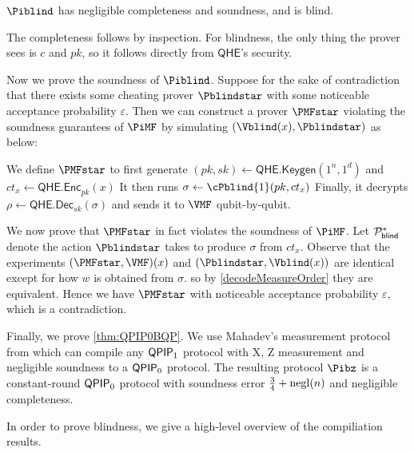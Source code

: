 \begin{thm}
	\label{thm:BlindBQP}
	$\Piblind$ has negligible completeness and soundness, and is blind.
\end{thm}
\begin{prf}
	The completeness follows by inspection.
	For blindness, the only thing the prover sees is $c$ and $pk$, so it follows directly from $\mathsf{QHE}$'s security.
	
	Now we prove the soundness of $\Piblind$.
	Suppose for the sake of contradiction that there exists some cheating prover $\Pblindstar$ with some noticeable acceptance probability $\varepsilon$.
	Then we can construct a prover $\PMFstar$ violating the soundness guarantees of $\PiMF$ by simulating $(\Vblind(x), \Pblindstar)$ as below:

	We define $\PMFstar$ to first generate
	$(pk, sk)\leftarrow\mathsf{QHE.Keygen}(1^n, 1^d)$
	and
	$ct_x\leftarrow\mathsf{QHE.Enc}_{pk}(x)$
	It then runs $\sigma\leftarrow\cPblind{1}(pk, ct_x)$
	Finally, it decrypts
	$\rho\leftarrow\mathsf{QHE.Dec}_{sk}(\sigma)$
	and sends it to $\VMF$ qubit-by-qubit.

	We now prove that $\PMFstar$ in fact violates the soundness of $\PiMF$.
	Let $\mathcal{P}_{\mathsf{blind}}^*$ denote the action $\Pblindstar$ takes to produce $\sigma$ from $ct_x$.
	Observe that the experiments $(\PMFstar, \VMF)(x)$ and $(\Pblindstar, \Vblind(x))$ are identical except for how $w$ is obtained from $\sigma$.
	so by \cref{decodeMeasureOrder} they are equivalent.
	Hence we have $\PMFstar$ with noticeable acceptance probability $\varepsilon$, which is a contradiction.
\end{prf}


Finally, we prove \cref{thm:QPIP0BQP}.
We use Mahadev's measurement protocol from \cite{FOCS:Mahadev18a} which can compile any $\operatorname{\mathsf{QPIP}}_1$ protocol with X, Z measurement and negligible soundness to a $\operatorname{\mathsf{QPIP}}_0$ protocol.
The resulting protocol $\Pibz$ is a constant-round $\operatorname{\mathsf{QPIP}}_0$ protocol with soundness error $\frac{3}{4} + \operatorname{negl}(n)$ and negligible completeness.

In order to prove blindness, we give a high-level overview of the compiliation results.

